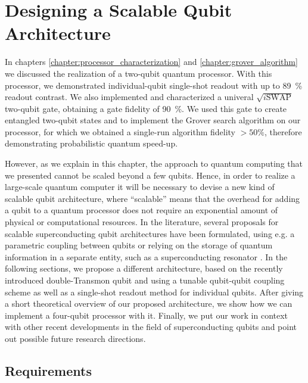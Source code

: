 \chapter{Designing a Scalable Qubit Architecture} \label{chapter:scalable_architecture}

In chapters \ref{chapter:processor_characterization} and \ref{chapter:grover_algorithm} we discussed the realization of a two-qubit quantum processor. With this processor, we demonstrated individual-qubit single-shot readout with up to \mbox{89 \%} readout contrast. We also implemented and characterized a univeral $\sqrt{i\mathrm{SWAP}}$ two-qubit gate, obtaining a gate fidelity of \mbox{90 \%}. We used this gate to create entangled two-qubit states and to implement the Grover search algorithm on our processor, for which we obtained a single-run algorithm fidelity $>50\%$, therefore demonstrating probabilistic quantum speed-up.

\smallskip

However, as we explain in this chapter, the approach to quantum computing that we presented cannot be scaled beyond a few qubits. Hence, in order to realize a large-scale quantum computer it will be necessary to devise a new kind of scalable qubit architecture, where ``scalable'' means that the overhead for adding a qubit to a quantum processor does not require an exponential amount of physical or computational resources. In the literature, several proposals for scalable superconducting qubit architectures have been formulated, using e.g. a parametric coupling between qubits \citep{bertet_parametric_2006} or relying on the storage of quantum information in a separate entity, such as a superconducting resonator \citep{galiautdinov_resonatorzero-qubit_2012,mariantoni_implementing_2011}. In the following sections, we propose a different architecture, based on the recently introduced double-Transmon qubit \citep{gambetta_superconducting_2011,srinivasan_tunable_2011} and using a tunable qubit-qubit coupling scheme as well as a single-shot readout method for individual qubits. After giving a short theoretical overview of our proposed architecture, we show how we can implement a four-qubit processor with it. Finally, we put our work in context with other recent developments in the field of superconducting qubits and point out possible future research directions.

\section{Requirements} \label{section:scalable_architecture}

